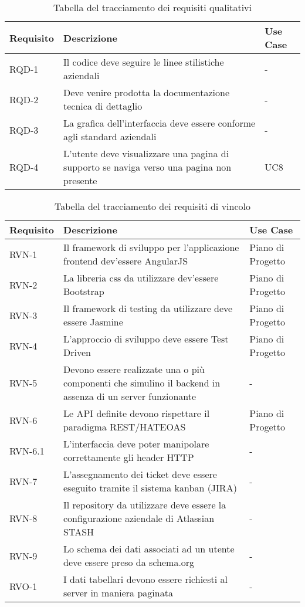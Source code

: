 \begin{table}%
\caption{Tabella del tracciamento dei requisiti qualitativi}
\label{tab:requisiti-qualitativi}
\begin{tabularx}{\textwidth}{lXl}
\hline\hline
\textbf{Requisito} & \textbf{Descrizione} & \textbf{Use Case}\\
\hline
RQD-1 & Il codice deve seguire le linee stilistiche aziendali & - \\
\hline
RQD-2 & Deve venire prodotta la documentazione tecnica di dettaglio & - \\
\hline
RQD-3 & La grafica dell'interfaccia deve essere conforme agli standard aziendali & - \\
\hline
RQD-4 & L'utente deve visualizzare una pagina di supporto se naviga verso una pagina non presente & UC8 \\
\hline
\end{tabularx}
\end{table}%

\begin{table}%
\caption{Tabella del tracciamento dei requisiti di vincolo}
\label{tab:requisiti-vincolo}
\begin{tabularx}{\textwidth}{lXl}
\hline\hline
\textbf{Requisito} & \textbf{Descrizione} & \textbf{Use Case}\\
\hline
RVN-1 & Il framework di sviluppo per l'applicazione frontend dev'essere AngularJS & Piano di Progetto \\
\hline
RVN-2 & La libreria css da utilizzare dev'essere Bootstrap & Piano di Progetto \\
\hline
RVN-3 & Il framework di testing da utilizzare deve essere Jasmine & Piano di Progetto \\
\hline
RVN-4 & L'approccio di sviluppo deve essere Test Driven & Piano di Progetto \\
\hline
RVN-5 & Devono essere realizzate una o più componenti che simulino il backend in assenza di un server funzionante & - \\
\hline
RVN-6 & Le API definite devono rispettare il paradigma REST/HATEOAS & Piano di Progetto \\
\hline
RVN-6.1 & L'interfaccia deve poter manipolare correttamente gli header HTTP & - \\
\hline
RVN-7 & L'assegnamento dei ticket deve essere eseguito tramite il sistema kanban (JIRA) & - \\
\hline
RVN-8 & Il repository da utilizzare deve essere la configurazione aziendale di Atlassian STASH & - \\
\hline
RVN-9 & Lo schema dei dati associati ad un utente deve essere preso da schema.org & - \\
\hline
RVO-1 & I dati tabellari devono essere richiesti al server in maniera paginata & - \\
\hline
\end{tabularx}
\end{table}%

